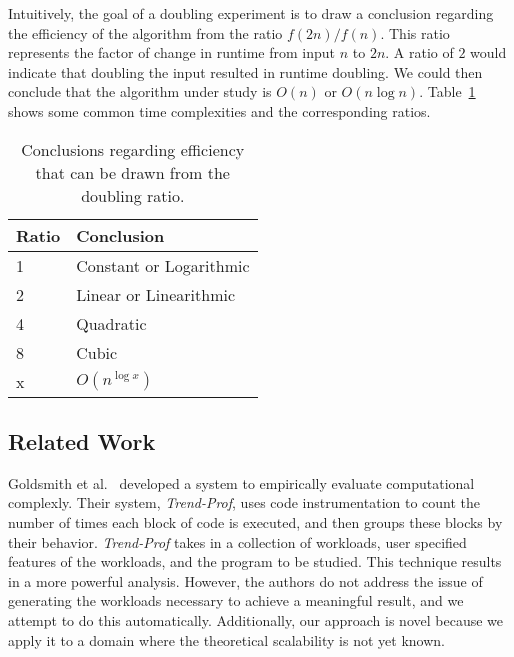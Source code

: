 Intuitively, the goal of a doubling experiment is to draw a conclusion regarding the efficiency of the algorithm from
the ratio $f(2n)/f(n)$. This ratio represents the factor of change in runtime from input $n$ to $2n$. A ratio of $2$
would indicate that doubling the input resulted in runtime doubling. We could then conclude that the algorithm under
study is $O(n)$ or $O(n\log n)$.  Table~\ref{table:ratios} shows some common time complexities and the corresponding
ratios.

\begin{table}[h]
\begin{tabular}{l|l}
Ratio & Conclusion              \\ \hline
1     & Constant or Logarithmic \\
2     & Linear or Linearithmic  \\
4     & Quadratic               \\
8     & Cubic                   \\
x     & $O(n^{\log x})$
\end{tabular}
\label{table:ratios}
\caption{Conclusions regarding efficiency that can be drawn from the
doubling ratio.}
\end{table}

\subsection{Related Work}

Goldsmith et al.~\cite{Goldsmith2007} developed a system to empirically evaluate computational complexly.  Their
system, \textit{Trend-Prof}, uses code instrumentation to count the number of times each block of code is executed,
and then groups these blocks by their behavior.  \textit{Trend-Prof} takes in a collection of workloads, user
specified features of the workloads, and the program to be studied. This technique results in a more powerful
analysis. However, the authors do not address the issue of generating the workloads necessary to achieve a meaningful
result, and we attempt to do this automatically.  Additionally, our approach is novel because we apply it to a domain
where the theoretical scalability is not yet known.
